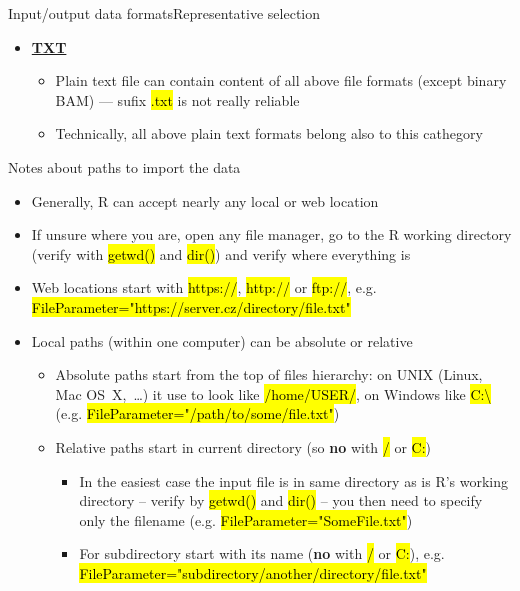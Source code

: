 \documentclass[compress, ucs, xelatex, 11pt, xcolor=svgnames,
  hyperref={
    bookmarks=true,
    unicode=true,
    colorlinks=true,
    pdftitle={Molecular data in R},
    plainpages=false,
    pdfauthor={Vojtech Zeisek},
    pdfsubject={Course about phylogeny and evolution in R},
    pdfcreator={XeLaTeX},
    pdfkeywords={R, evolution, phylogeny, molecular data},
    linkcolor=Tomato,
    anchorcolor=SaddleBrown,
    citecolor=Goldenrod,
    filecolor=DarkMagenta,
    menucolor=Sienna,
    urlcolor=DarkTurquoise,
    pdftex},
  url={hyphens, lowtilde} %
  ]{beamer}
\renewcommand{\texttt}[1]{\hl{\ttfamily #1}}
\begin{document}
\begin{frame}[allowframebreaks]{Input/output data formats}{Representative selection}
\begin{itemize}
    \begin{itemize}
      \item 
    \end{itemize}
    \item \href{https://en.wikipedia.org/wiki/Text_file}{\textbf{TXT}}
    \begin{itemize}
      \item Plain text file can contain content of all above file formats (except binary BAM) --- sufix \texttt{*.txt} is not really reliable
      \item Technically, all above plain text formats belong also to this cathegory
    \end{itemize}
  \end{itemize}
\end{frame}

\begin{frame}[allowframebreaks]{Notes about paths to import the data}
  \label{path}
  \begin{itemize}
    \item Generally, R can accept nearly any local or web location
    \item If unsure where you are, open any file manager, go to the R working directory (verify with \texttt{getwd()} and \texttt{dir()}) and verify where everything is
    \item Web locations start with \texttt{https://}, \texttt{http://} or \texttt{ftp://}, e.g. \texttt{FileParameter="https://server.cz/directory/file.txt"}
    \item Local paths (within one computer) can be absolute or relative
    \begin{itemize}
      \item Absolute paths start from the top of files hierarchy: on UNIX (Linux, Mac OS~X,~\ldots) it use to look like \texttt{/home/USER/}, on Windows like \texttt{C:\textbackslash} (e.g. \texttt{FileParameter="/path/to/some/file.txt"})
      \item Relative paths start in current directory (so \textbf{no} with \texttt{/} or \texttt{C:})
      \begin{itemize}
	\item In the easiest case the input file is in same directory as is R's working directory -- verify by \texttt{getwd()} and \texttt{dir()} -- you then need to specify only the filename (e.g. \texttt{FileParameter="SomeFile.txt"})
	\item For subdirectory start with its name (\textbf{no} with \texttt{/} or \texttt{C:}), e.g. \texttt{FileParameter="subdirectory/another/directory/file.txt"}

\end{itemize}
\end{itemize}
\end{itemize}
\end{frame}
\end{document}
